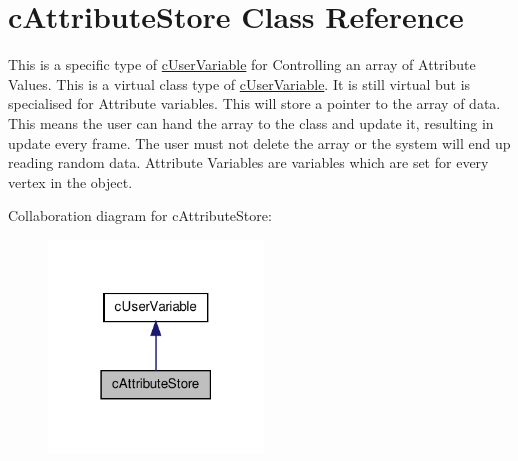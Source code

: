 \hypertarget{classc_attribute_store}{
\section{cAttributeStore Class Reference}
\label{classc_attribute_store}
}


This is a specific type of \hyperlink{classc_user_variable}{cUserVariable} for Controlling an array of Attribute Values. This is a virtual class type of \hyperlink{classc_user_variable}{cUserVariable}. It is still virtual but is specialised for Attribute variables. This will store a pointer to the array of data. This means the user can hand the array to the class and update it, resulting in update every frame. The user must not delete the array or the system will end up reading random data. Attribute Variables are variables which are set for every vertex in the object.  




Collaboration diagram for cAttributeStore:\nopagebreak
\begin{figure}[H]
\begin{center}
\leavevmode
\includegraphics[width=162pt]{classc_attribute_store__coll__graph}
\end{center}
\end{figure}
